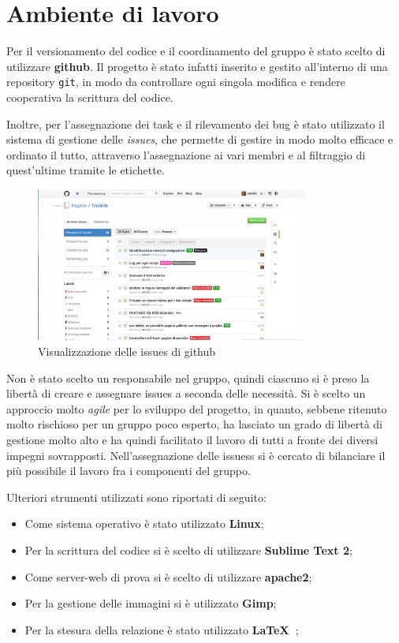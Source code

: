 \section{Ambiente di lavoro}

Per il versionamento del codice e il coordinamento del gruppo è stato scelto di utilizzare \textbf{github}. Il progetto è stato infatti inserito e gestito all'interno di una repository \texttt{git}, in modo da controllare ogni singola modifica e rendere cooperativa la scrittura del codice.

Inoltre, per l'assegnazione dei task e il rilevamento dei bug è stato utilizzato il sistema di gestione delle \textit{issues}, che permette di gestire in modo molto efficace e ordinato il tutto, attraverso l'assegnazione ai vari membri e al filtraggio di quest'ultime tramite le etichette.

\begin{figure}[H]
		\centering \includegraphics[width=0.8\textwidth]{images/github.png}
		\caption{Visualizzazione delle issues di github}
\end{figure}

Non è stato scelto un responsabile nel gruppo, quindi ciascuno si è preso la libertà di creare e assegnare issues a seconda delle necessità. Si è scelto un approccio molto \textit{agile} per lo sviluppo del progetto, in quanto, sebbene ritenuto molto rischioso per un gruppo poco esperto, ha lasciato un grado di libertà di gestione molto alto e ha quindi facilitato il lavoro di tutti a fronte dei diversi impegni sovrapposti. Nell'assegnazione delle issuess si è cercato di bilanciare il più possibile il lavoro fra i componenti del gruppo.

Ulteriori strumenti utilizzati sono riportati di seguito:

\begin{itemize}

	\item Come sistema operativo è stato utilizzato \textbf{Linux};
	\item Per la scrittura del codice si è scelto di utilizzare \textbf{Sublime Text 2};
	\item Come server-web di prova si è scelto di utilizzare \textbf{apache2};
	\item Per la gestione delle immagini si è utilizzato \textbf{Gimp};
	\item Per la stesura della relazione è stato utilizzato \textbf{\LaTeX\ };

\end{itemize}


